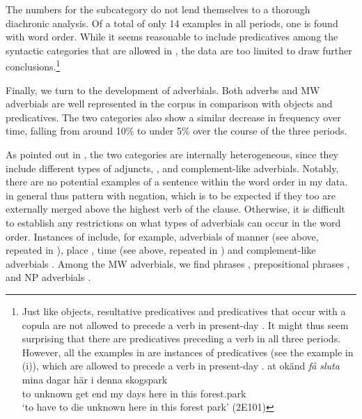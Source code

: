 \documentclass[output=paper, colorlinks, citecolor=brown]{langscibook}
\begin{document}
The numbers for the  subcategory do not lend themselves to a thorough diachronic analysis. Of a total of only 14 examples in all periods, one is found with  word order. While it seems reasonable to include predicatives among the syntactic categories that are allowed in , the data are too limited to draw further conclusions.\footnote{Just like objects, resultative predicatives and predicatives that occur with a copula are not allowed to precede a verb in present-day . It might thus seem surprising that there are predicatives preceding a verb in all three periods. However, all the examples in  are instances of  predicatives (see the example in (i)), which are allowed to precede a verb in present-day .  
\ea \gll at okänd \textit{få} \textit{sluta} mina  dagar  här  i  denna  skogspark\\
         to unknown  get  end  my  days  here  in  this  forest.park\\
     \glt ‘to have to die unknown here in this forest park’ (2E101)
\z}



Finally, we turn to the development of adverbials. Both adverbs and MW adverbials are well represented in the corpus in comparison with objects and predicatives. The two  categories also show a similar decrease in frequency over time, falling from around 10\% to under 5\% over the course of the three periods.\largerpage[3]



As pointed out in , the two  categories are internally heterogeneous, since they include different types of adjuncts, , and complement-like adverbials. Notably, there are no potential examples of a sentence  within the  word order in my data.  in general thus pattern with negation, which is to be expected if they too are externally merged above the highest verb of the clause. Otherwise, it is difficult to establish any restrictions on what types of adverbials can occur in the  word order. Instances of  include, for example, adverbials of manner (see  above, repeated in ), place , time (see  above, repeated in ) and complement-like adverbials . Among the MW adverbials, we find  phrases , prepositional phrases , and NP adverbials .
\end{document}
